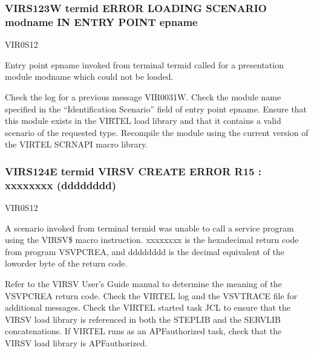 \documentclass[letterpaper,10pt,english]{sphinxmanual}
\begin{document}
\subsubsection{VIRS123W termid ERROR LOADING SCENARIO modname IN ENTRY POINT epname}
\label{\detokenize{messages:virs123w-termid-error-loading-scenario-modname-in-entry-point-epname}}\begin{description}
\sphinxAtStartPar
VIR0S12

\sphinxAtStartPar
Entry point epname invoked from terminal termid called for a presentation module modname which could not be loaded.

\sphinxAtStartPar
Check the log for a previous message VIR0031W. Check the module name specified in the “Identification Scenario” field of entry point epname. Ensure that this module exists in the VIRTEL load library and that it contains a valid scenario of the requested type. Recompile the module using the current version of the VIRTEL SCRNAPI macro library.

\end{description}


\subsubsection{VIRS124E termid VIRSV CREATE ERROR \textendash{} R15 : xxxxxxxx (dddddddd)}
\label{\detokenize{messages:virs124e-termid-virsv-create-error-r15-xxxxxxxx-dddddddd}}\begin{description}
\sphinxAtStartPar
VIR0S12

\sphinxAtStartPar
A scenario invoked from terminal termid was unable to call a service program using the VIRSV\$ macro instruction. xxxxxxxx is the hexadecimal return code from program VSVPCREA, and dddddddd is the decimal equivalent of the low\sphinxhyphen{}order byte of the return code.

\sphinxAtStartPar
Refer to the VIRSV User’s Guide manual to determine the meaning of the VSVPCREA return code. Check the VIRTEL log and the VSVTRACE file for additional messages. Check the VIRTEL started task JCL to ensure that the VIRSV load library is referenced in both the STEPLIB and the SERVLIB concatenations. If VIRTEL runs as an APF\sphinxhyphen{}authorized task, check that the VIRSV load library is APF\sphinxhyphen{}authorized.

\end{description}
\end{document}

